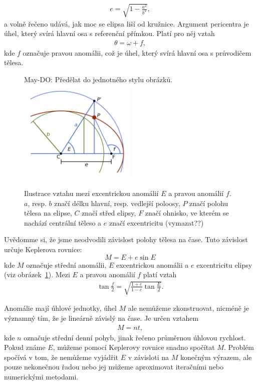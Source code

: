 \documentclass[A4paper, 12pt, oneside]{book}
\begin{document}
\begin{align}
	e=\sqrt{1-\frac{a^2}{b^2}},
\end{align}
a volně řečeno udává, jak moc se elipsa liší od kružnice.
Argument pericentra je úhel, který svírá hlavní osa s referenční přímkou. Platí pro něj vztah
\begin{align}
	\theta=\omega+f,
\end{align}
kde $f$ označuje pravou anomálii, což je úhel, který svírá hlavní osa s průvodičem tělesa.

\begin{figure} 
	\centering
	May-DO: Předělat do jednotného stylu obrázků.
	\includegraphics[width=0.5\textwidth]{obr/Eanomaly.png}
	\caption{Ilustrace vztahu mezi excentrickou anomálií $E$ a pravou anomálií $f$. $a$, resp. $b$ značí délku hlavní, resp. vedlejší poloosy, $P$ značí polohu tělesa na elipse, $C$ značí střed elipsy, $F$ značí ohnisko, ve kterém se nachází centrální těleso a $e$ značí excentricitu (vymazat??)} \label{fig:E}
\end{figure}

Uvědomme si, že jsme neodvodili závislost polohy tělesa na čase. Tuto závislost určuje Keplerova rovnice:
\begin{equation} \label{eq:kepler}
M = E + e\sin E
\end{equation}
kde $M$ označuje střední anomálii, $E$ excentrickou anomálii a $e$ excentricitu elipsy (viz obrázek~\ref{fig:E}). Mezi $E$ a pravou anomálií $f$ platí vztah
\begin{align} \label {eq:fE}
	\tan \frac{f}{2} = \sqrt{\frac{1+e}{1-e}\tan \frac{E}{2}}.
\end{align}

Anomálie mají úhlové jednotky, úhel $M$ ale nemůžeme zkonstruovat, nicméně je významný tím, že je lineárně závislý na čase. Je určen vztahem 
\begin{align} \label{eq:M}
	M=nt,
\end{align}
kde $n$ označuje střední denní pohyb, jinak řečeno průměrnou úhlovou rychlost. Pokud známe $E$, můžeme pomocí Keplerovy rovnice snadno spočítat $M$. Problém spočívá v tom, že nemůžeme vyjádřit $E$ v závisloti na $M$ konečným výrazem, ale pouze nekonečnou řadou nebo jej můžeme aproximovat iteračními nebo numerickými metodami.
\end{document}
